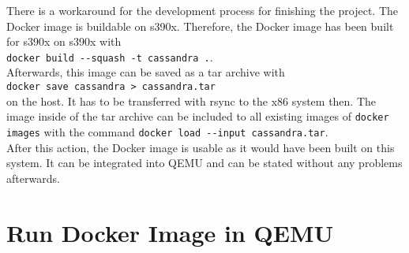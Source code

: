 There is a workaround for the development process for finishing the project. The Docker image is buildable on s390x. Therefore, the Docker image has been built for s390x on s390x with \\  
\lstinline!docker build --squash -t cassandra .!. \\
Afterwards, this image can be saved as a tar archive with \\
\lstinline!docker save cassandra > cassandra.tar!\\ 
on the host. It has to be transferred with rsync to the x86 system then. The image inside of the tar archive can be included to all existing images of \lstinline!docker images! with the command 
\lstinline!docker load --input cassandra.tar!. \\
After this action, the Docker image is usable as it would have been built on this system. 
It can be integrated into QEMU and can be stated without any problems afterwards.




\section{Run Docker Image in QEMU}\label{RunningDockerImage}

